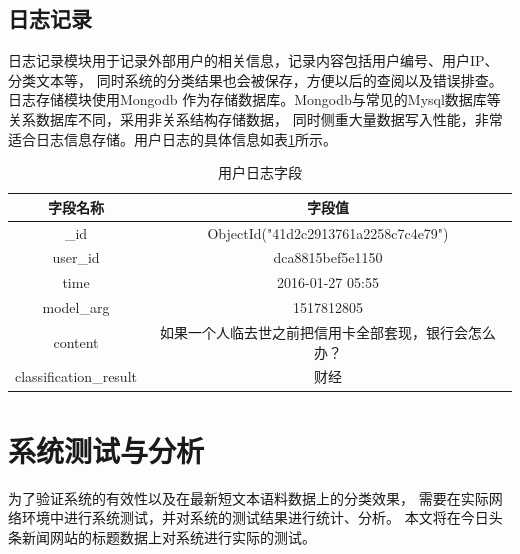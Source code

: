 \documentclass{standalone}
\begin{document}
\subsection{日志记录}
日志记录模块用于记录外部用户的相关信息，记录内容包括用户编号、用户IP、分类文本等，
同时系统的分类结果也会被保存，方便以后的查阅以及错误排查。日志存储模块使用Mongodb
作为存储数据库。Mongodb与常见的Mysql数据库等关系数据库不同，采用非关系结构存储数据，
同时侧重大量数据写入性能，非常适合日志信息存储。用户日志的具体信息如表\ref{log_table}所示。
\begin{table}[h]
    \caption{用户日志字段}
    \begin{tabular}{|c|c|}
        \hline
        字段名称 & 字段值 \\
        \hline
        \_id & ObjectId("41d2c2913761a2258c7c4e79") \\
        \hline
        user\_id & dca8815bef5e1150 \\
        \hline
        time & 2016-01-27 05:55 \\
        \hline
        model\_arg & 1517812805 \\
        \hline
        content & 如果一个人临去世之前把信用卡全部套现，银行会怎么办？ \\
        \hline
        classification\_result & 财经 \\
        \hline
    \end{tabular}
    \label{log_table}
    \end{table}

\section{系统测试与分析}
为了验证系统的有效性以及在最新短文本语料数据上的分类效果，
需要在实际网络环境中进行系统测试，并对系统的测试结果进行统计、分析。
本文将在今日头条新闻网站的标题数据上对系统进行实际的测试。
\end{document}
